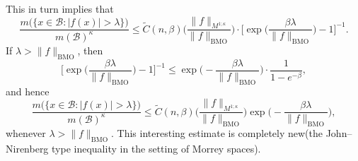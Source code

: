 \documentclass{birkjour}
\theoremstyle{definition}
\theoremstyle{remark}
\numberwithin{equation}{section}
\begin{document}
This in turn implies that
\begin{equation*}
\frac{m\big(\big\{x\in\mathcal{B}:|f(x)|>\lambda\big\}\big)}{m(\mathcal{B})^{\kappa}}
\leq \widetilde{C}({n,\beta})\bigg(\frac{\|f\|_{M^{1;\kappa}}}{\|f\|_{\mathrm{BMO}}}\bigg)
\cdot\Big[\exp\Big(\frac{\beta\lambda}{\|f\|_{\mathrm{BMO}}}\Big)-1\Big]^{-1}.
\end{equation*}
If $\lambda>\|f\|_{\mathrm{BMO}}$, then
\begin{equation*}
\Big[\exp\Big(\frac{\beta\lambda}{\|f\|_{\mathrm{BMO}}}\Big)-1\Big]^{-1}
\leq\exp\Big(-\frac{\beta\lambda}{\|f\|_{\mathrm{BMO}}}\Big)
\cdot\frac{1}{1-e^{-\beta}},
\end{equation*}
and hence
\begin{equation*}
\frac{m\big(\big\{x\in\mathcal{B}:|f(x)|>\lambda\big\}\big)}{m(\mathcal{B})^{\kappa}}
\leq \widetilde{C}({n,\beta})\bigg(\frac{\|f\|_{M^{1;\kappa}}}{\|f\|_{\mathrm{BMO}}}\bigg)
\exp\Big(-\frac{\beta\lambda}{\|f\|_{\mathrm{BMO}}}\Big),
\end{equation*}
whenever $\lambda>\|f\|_{\mathrm{BMO}}$. This interesting estimate is completely new(the John--Nirenberg type inequality in the setting of Morrey spaces).
\end{document}
